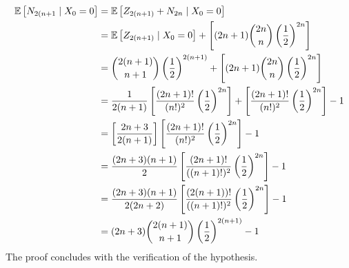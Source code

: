 \documentclass[12pt]{article}%
\begin{document}
\begin{enumerate}
        \begin{align*}
          \mathbb{E}\left[{N_{2(n+1}}\mid {X_{0} = 0}\right] & = \mathbb{E}\left[{Z_{2(n+1)} + N_{2n}}\mid {X_0 = 0}\right] \\
                                         & = \mathbb{E}\left[{Z_{2(n+1)}}\mid {X_0 = 0}\right] + \left[(2n+1)\binom{2n}{n}\left(\frac{1}{2}\right)^{2n}\right] \\
                                         & =  \binom{2(n+1)}{n+1}\left(\frac{1}{2}\right)^{2(n+1)} + \left[(2n+1)\binom{2n}{n}\left(\frac{1}{2}\right)^{2n}\right] \\
                                         & = \frac{1}{2(n+1)}\left[\frac{(2n+1)!}{(n!)^{2}}\left(\frac{1}{2}\right)^{2n}\right] + \left[\frac{(2n+1)!}{(n!)^{2}}\left(\frac{1}{2}\right)^{2n}\right] - 1 \\
                                         & = \left[\frac{2n+3}{2(n+1)}\right]\left[\frac{(2n+1)!}{(n!)^{2}}\left(\frac{1}{2}\right)^{2n}\right] - 1 \\
                                         & = \frac{(2n+3)(n+1)}{2}\left[\frac{(2n+1)!}{((n+1)!)^{2}}\left(\frac{1}{2}\right)^{2n}\right] - 1 \\
                                         & = \frac{(2n+3)(n+1)}{2(2n +2)}\left[\frac{(2(n+1))!}{((n+1)!)^{2}}\left(\frac{1}{2}\right)^{2n}\right] - 1 \\
          & = (2n + 3) \binom{2(n+1)}{n+1}\left(\frac{1}{2}\right)^{2(n+1)} - 1
        \end{align*}
The proof concludes with the verification of the hypothesis.
\end{enumerate}
\end{document}

